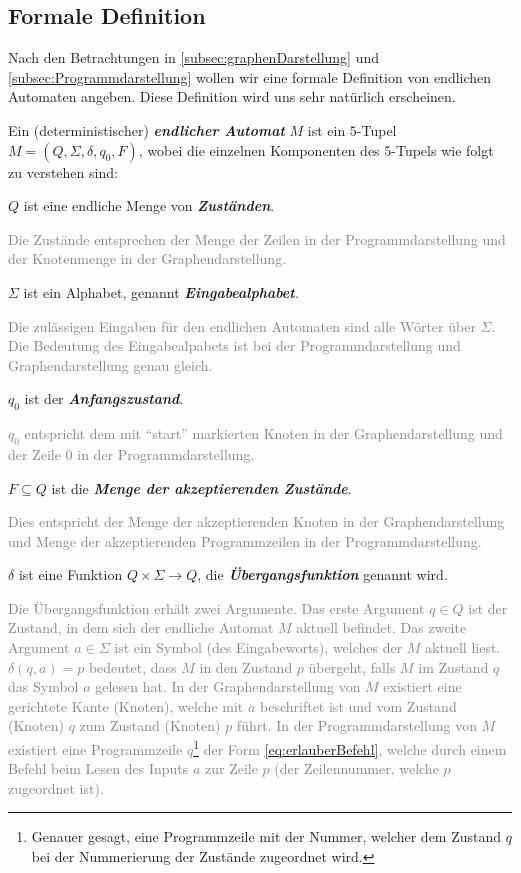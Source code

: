 \subsection{Formale Definition}\label{subsec:formaleDefinitionEA}
Nach den Betrachtungen in \cref{subsec:graphenDarstellung} und \cref{subsec:Programmdarstellung} wollen wir eine formale Definition von endlichen Automaten angeben. Diese Definition wird uns sehr natürlich erscheinen.
\begin{mydefinition}\label{mydefinition:endlicherAutomat}
Ein (deterministischer) \textit{\textbf{endlicher Automat}} $M$ ist ein $5$-Tupel $M = (Q,\Sigma, \delta, q_0, F)$, wobei die einzelnen Komponenten des $5$-Tupels wie folgt zu verstehen sind:
\begin{renum}
	\item $Q$ ist eine endliche Menge von \textit{\textbf{Zuständen}}.

	\textcolor{Gray}{Die Zustände entsprechen der Menge der Zeilen in der Programmdarstellung und der Knotenmenge in der Graphendarstellung.}
	\item $\Sigma$ ist ein Alphabet, genannt \textit{\textbf{Eingabealphabet}.}

	\textcolor{Gray}{Die zulässigen Eingaben für den endlichen Automaten sind alle Wörter über $\Sigma$. Die Bedeutung des Eingabealpabets ist bei der Programmdarstellung und Graphendarstellung genau gleich.}
	\item $q_0$ ist der \textit{\textbf{Anfangszustand}}.

	\textcolor{Gray}{$q_0$ entspricht dem mit \enquote{start} markierten Knoten in der Graphendarstellung und der Zeile $0$ in der Programmdarstellung.}
	\item $F\subseteq Q$ ist die \textit{\textbf{Menge der akzeptierenden Zustände}}.

	\textcolor{Gray}{Dies entspricht der Menge der akzeptierenden Knoten in der Graphendarstellung und Menge der akzeptierenden Programmzeilen in der Programmdarstellung.}
	\item $\delta$ ist eine Funktion $Q\times \Sigma \to Q$, die \textit{\textbf{Übergangsfunktion}} genannt wird.

	\textcolor{Gray}{Die Übergangsfunktion erhält zwei Argumente. Das erste Argument $q\in Q$  ist der Zustand, in dem sich der endliche Automat $M$ aktuell befindet. Das zweite Argument $a\in \Sigma$ ist ein Symbol (des Eingabeworts), welches der $M$ aktuell liest. $\delta (q,a) = p$ bedeutet, dass $M$ in den Zustand $p$ übergeht, falls $M$ im Zustand $q$ das Symbol $a$ gelesen hat. In der Graphendarstellung von $M$ existiert eine gerichtete Kante (Knoten), welche mit $a$ beschriftet ist und vom Zustand (Knoten) $q$ zum Zustand (Knoten) $p$ führt. In der Programmdarstellung von $M$ existiert eine Programmzeile $q$\footnote{Genauer gesagt, eine Programmzeile mit der Nummer, welcher dem Zustand $q$ bei der Nummerierung der Zustände zugeordnet wird.} der Form \cref{eq:erlauberBefehl}, welche durch einem  Befehl beim Lesen des Inputs $a$ zur Zeile $p$ (der Zeilennummer, welche $p$ zugeordnet ist).}
\end{renum}
\end{mydefinition}
